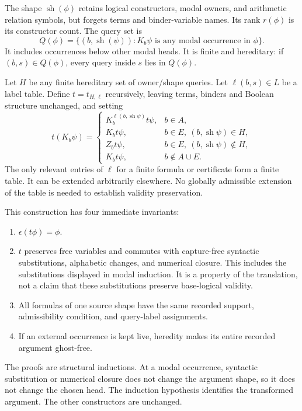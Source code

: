 \documentclass[
  11pt,
  letterpaper,
]{article}
\providecommand{\tightlist}{%
  \setlength{\itemsep}{0pt}\setlength{\parskip}{0pt}}
\begin{document}
The shape \(\operatorname{sh}(\phi)\) retains logical constructors,
modal owners, and arithmetic relation symbols, but forgets terms and
binder-variable names. Its rank \(r(\phi)\) is its constructor count.
The query set is \[
Q(\phi)=\{(b,\operatorname{sh}(\psi)):K_b\psi
\text{ is any modal occurrence in }\phi\}.
\] It includes occurrences below other modal heads. It is finite and
hereditary: if \((b,s)\in Q(\phi)\), every query inside \(s\) lies in
\(Q(\phi)\).

Let \(H\) be any finite hereditary set of owner/shape queries. Let
\(\ell(b,s)\in L\) be a label table. Define \(t=t_{H,\ell}\)
recursively, leaving terms, binders and Boolean structure unchanged, and
setting \[
t(K_b\psi)=
\begin{cases}
K_b^{\ell(b,\operatorname{sh}\psi)}t\psi,&b\in A,\\
K_b t\psi,&b\in E,\ (b,\operatorname{sh}\psi)\in H,\\
Z_b t\psi,&b\in E,\ (b,\operatorname{sh}\psi)\notin H,\\
K_b t\psi,&b\notin A\cup E.
\end{cases}
\] The only relevant entries of \(\ell\) for a finite formula or
certificate form a finite table. It can be extended arbitrarily
elsewhere. No globally admissible extension of the table is needed to
establish validity preservation.

This construction has four immediate invariants:

\begin{enumerate}
\def\labelenumi{\arabic{enumi}.}
\tightlist
\item
  \(\epsilon(t\phi)=\phi\).
\item
  \(t\) preserves free variables and commutes with capture-free
  syntactic substitutions, alphabetic changes, and numerical closure.
  This includes the substitutions displayed in modal induction. It is a
  property of the translation, not a claim that these substitutions
  preserve base-logical validity.
\item
  All formulas of one source shape have the same recorded support,
  admissibility condition, and query-label assignments.
\item
  If an external occurrence is kept live, heredity makes its entire
  recorded argument ghost-free.
\end{enumerate}

The proofs are structural inductions. At a modal occurrence, syntactic
substitution or numerical closure does not change the argument shape, so
it does not change the chosen head. The induction hypothesis identifies
the transformed argument. The other constructors are unchanged.
\end{document}
